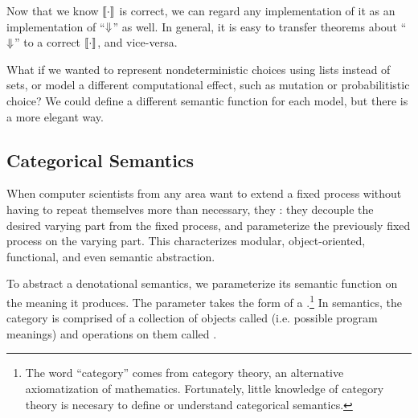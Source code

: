 Now that we know $\left\llbracket{\cdot}\right\rrbracket$ is correct, we can regard any implementation of it as an implementation of ``$\operatorname{\Downarrow}$''  as well.
In general, it is easy to transfer theorems about ``$\operatorname{\Downarrow}$'' to a correct $\left\llbracket{\cdot}\right\rrbracket$, and vice-versa.

What if we wanted to represent nondeterministic choices using lists instead of sets, or model a different computational effect, such as mutation or probabilitistic choice?
We could define a different semantic function for each model, but there is a more elegant way.


\subsection{Categorical Semantics}

When computer scientists from any area want to extend a fixed process without having to repeat themselves more than necessary, they : they decouple the desired varying part from the fixed process, and parameterize the previously fixed process on the varying part.
This characterizes modular, object-oriented, functional, and even semantic abstraction.

To abstract a denotational semantics, we parameterize its semantic function on the meaning it produces.
The parameter takes the form of a .\footnote{The word ``category'' comes from category theory, an alternative axiomatization of mathematics. Fortunately, little knowledge of category theory is necesary to define or understand categorical semantics.}
In semantics, the category is comprised of a collection of objects called  (i.e. possible program meanings) and operations on them called .

